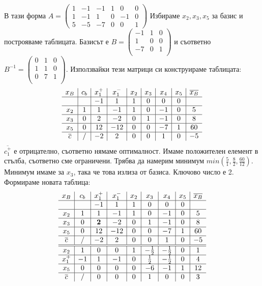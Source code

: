 \documentclass[12pt, a4paper]{article}
\begin{document}
В тази форма $A=
\begin{pmatrix}
	1 & -1 & -1 & 1 & 0 & 0\\
	1 & -1 & 1 & 0 & -1 & 0\\
	5 & -5 & -7 & 0 & 0 & 1
\end{pmatrix}
$
Избираме $x_2, x_3, x_5$ за базис и построяваме таблицата. Базисът е $B=
\begin{pmatrix}
	-1 & 1 & 0\\
	1 & 0 & 0\\
	-7 & 0 & 1\\
\end{pmatrix}$ и съответно $B^{-1}=
\begin{pmatrix}
	0 & 1 & 0\\
	1 & 1 & 0\\
	0 & 7 & 1\\
\end{pmatrix}
$. Използвайки тези матрици си конструираме таблицата:
\[
\begin{array}{c|c|c|c|c|c|c|c|c}
	x_B & c_b & x_1^+ & x_1^- & x_2 & x_3 & x_4 & x_5 & \overline{x_B}\\
	\hline
	&&-1&1&1&0&0&0& \\
	\hline
	x_2&1&1&-1&1&0&-1&0&5 \\
	\hline
	x_3&0&2&-2&0&1&-1&0&8 \\
	\hline
	x_5&0&12&-12&0&0&-7&1&60 \\
	\hline
	\overline{c}&/&-2&2&0&0&1&0&-5\\
\end{array}
\]
$\overline{c_1^+}$ е отрицателно, съответно нямаме оптималност. Имаме положителен елемент в стълба, съответно сме ограничени. Трябва да намерим минимум $min(\frac{5}{1},\frac{8}{2},\frac{60}{12})$. Минимум имаме за $x_3$, така че това излиза от базиса. Ключово число е 2. Формираме новата таблица:\\
\[
\begin{array}{c|c|c|c|c|c|c|c|c}
	x_B & c_b & x_1^+ & x_1^- & x_2 & x_3 & x_4 & x_5 & \overline{x_B}\\
	\hline
	&&-1&1&1&0&0&0& \\
	\hline
	x_2&1&1&-1&1&0&-1&0&5 \\
	\hline
	x_3&0&\textbf{2}&-2&0&1&-1&0&8 \\
	\hline
	x_5&0&12&-12&0&0&-7&1&60 \\
	\hline
	\overline{c}&/&-2&2&0&0&1&0&-5\\
	\hline\hline
	x_2&1&0&0&1&-\frac{1}{2}&-\frac{1}{2}&0&1 \\
	\hline
	x_1^+&-1&1&-1&0&\frac{1}{2}&-\frac{1}{2}&0&4 \\
	\hline
	x_5&0&0&0&0&-6&-1&1&12 \\
	\hline
	\overline{c}&/&0&0&0&1&0&0&3\\
\end{array}
\]
\end{document}
